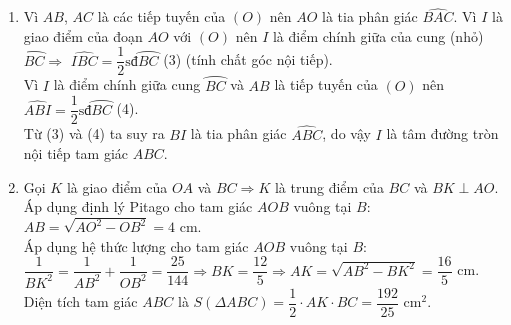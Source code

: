 \begin{bt}
{\begin{enumerate}
Từ (1) và (2) ta có $BOCH$ là hình bình hành. Mà $OB=OC$ nên $BOCH$ là hình thoi.
\item Vì $AB$, $AC$ là các tiếp tuyến của $(O)$ nên $AO$ là tia phân giác $\widehat{BAC}$. Vì $I$ là giao điểm của đoạn $AO$ với $(O)$ nên $I$ là điểm chính giữa của cung (nhỏ) $\wideparen{BC}\Rightarrow $ $\widehat{IBC}=\dfrac{1}{2}\mbox{sđ}\wideparen{BC}$ (3) (tính chất góc nội tiếp).\\
Vì $I$ là điểm chính giữa cung $\wideparen{BC}$ và $AB$ là tiếp tuyến của $(O)$ nên $\widehat{ABI}=\dfrac{1}{2}\mbox{sđ}\wideparen{BC}$ (4).\\
Từ (3) và (4) ta suy ra $BI$ là tia phân giác $\widehat{ABC}$, do vậy $I$ là tâm đường tròn nội tiếp tam giác $ABC$. 
\item Gọi $K$ là giao điểm của $OA$ và $BC\Rightarrow K$ là trung điểm của $BC$ và $BK\perp AO$.\\
Áp dụng định lý Pitago cho tam giác $AOB$ vuông tại $B$: $AB=\sqrt{AO^{2}-OB^{2}}=4$ cm.\\
Áp dụng hệ thức lượng cho tam giác $AOB$ vuông tại $B$:\\
$\dfrac{1}{BK^{2}}=\dfrac{1}{AB^{2}}+\dfrac{1}{OB^{2}}=\dfrac{25}{144}\Rightarrow BK=\dfrac{12}{5}\Rightarrow AK=\sqrt{AB^{2}-BK^{2}}=\dfrac{16}{5}$ cm.\\
Diện tích tam giác $ABC$ là $S(\Delta ABC)=\dfrac{1}{2}\cdot AK\cdot BC=\dfrac{192}{25}$ cm$^{2}$.
\end{enumerate}
}
\end{bt}

